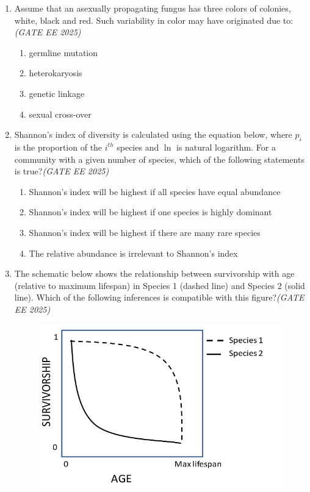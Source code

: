 \begin{enumerate}[leftmargin=*,label=\textbf{Q.\arabic*},resume]
\rule{4cm}{0.15mm}

\item Assume that an asexually propagating fungus has three colors of colonies, white, black and red. Such variability in color may have originated due to:\hfill \textit{(GATE EE 2025)}
\begin{multicols}{2}
\begin{enumerate}[label=(\Alph*)]
\item germline mutation
\item heterokaryosis
\item genetic linkage
\item sexual cross-over
\end{enumerate}
\end{multicols}

\item Shannon's index of diversity is calculated using the equation below, where $p_i$ is the proportion of the $i^{th}$ species and $\ln$ is natural logarithm. For a community with a given number of species, which of the following statements is true?\hfill \textit{(GATE EE 2025)}
\begin{multicols}{2}
\begin{enumerate}[label=(\Alph*)]
\item Shannon's index will be highest if all species have equal abundance
\item Shannon's index will be highest if one species is highly dominant
\item Shannon's index will be highest if there are many rare species
\item The relative abundance is irrelevant to Shannon's index
\end{enumerate}
\end{multicols}

\item The schematic below shows the relationship between survivorship with age (relative to maximum lifespan) in Species 1 (dashed line) and Species 2 (solid line). Which of the following inferences is compatible with this figure?\hfill \textit{(GATE EE 2025)}
\vspace{1em}
\begin{figure}[h!]
    \centering
    \includegraphics[width=0.9\linewidth]{figs/imageQ52.png}
\end{figure}
\vspace{1em}



\end{enumerate}

